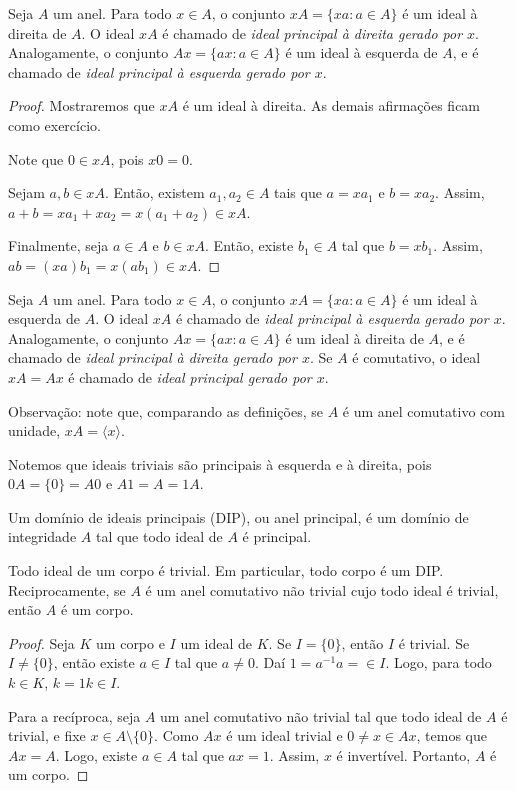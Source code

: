 \begin{definition}
    Seja $A$ um anel. Para todo $x \in A$, o conjunto $xA=\{xa:a \in A\}$ é um ideal à direita de $A$. O ideal $xA$ é chamado de \emph{ideal principal à direita gerado por $x$}.
    Analogamente, o conjunto $Ax=\{ax:a \in A\}$ é um ideal à esquerda de $A$, e é chamado de \emph{ideal principal à esquerda gerado por $x$}.
\end{definition}
\begin{proof}
Mostraremos que $xA$ é um ideal à direita. As demais afirmações ficam como exercício.

Note que $0 \in xA$, pois $x0=0$.

Sejam $a, b \in xA$. Então, existem $a_1, a_2 \in A$ tais que $a=xa_1$ e $b=xa_2$. Assim, $a+b=xa_1+xa_2=x(a_1+a_2) \in xA$.

Finalmente, seja $a \in A$ e $b \in xA$. Então, existe $b_1 \in A$ tal que $b=xb_1$. Assim, $ab=(xa)b_1=x(ab_1) \in xA$.
\end{proof}
\begin{definition}
    Seja $A$ um anel. Para todo $x \in A$, o conjunto $xA=\{xa:a \in A\}$ é um ideal à esquerda de $A$. O ideal $xA$ é chamado de \emph{ideal principal à esquerda gerado por $x$}.
    Analogamente, o conjunto $Ax=\{ax:a \in A\}$ é um ideal à direita de $A$, e é chamado de \emph{ideal principal à direita gerado por $x$}.
    Se $A$ é comutativo, o ideal $xA=Ax$ é chamado de \emph{ideal principal gerado por $x$}.
\end{definition}

Observação: note que, comparando as definições, se $A$ é um anel comutativo com unidade, $xA=\langle x\rangle$.

Notemos que ideais triviais são principais à esquerda e à direita, pois $0A=\{0\}=A0$ e $A1=A=1A$.

\begin{definition}
    Um domínio de ideais principais (DIP), ou anel principal, é um domínio de integridade $A$ tal que todo ideal de $A$ é principal.
\end{definition}

\begin{prop}
    Todo ideal de um corpo é trivial. Em particular, todo corpo é um DIP. Reciprocamente, se $A$ é um anel comutativo não trivial cujo todo ideal é trivial, então $A$ é um corpo.
\end{prop}
\begin{proof}
Seja $K$ um corpo e $I$ um ideal de $K$. Se $I=\{0\}$, então $I$ é trivial. Se $I\neq \{0\}$, então existe $a \in I$ tal que $a \neq 0$. Daí $1=a^{-1}a=\in I$. Logo, para todo $k \in K$, $k=1k\in I$.

Para a recíproca, seja $A$ um anel comutativo não trivial tal que todo ideal de $A$ é trivial, e fixe $x \in A\setminus \{0\}$. Como $Ax$ é um ideal trivial e $0\neq x \in Ax$, temos que $Ax=A$. Logo, existe $a \in A$ tal que $ax=1$. Assim, $x$ é invertível. Portanto, $A$ é um corpo.
\end{proof}


